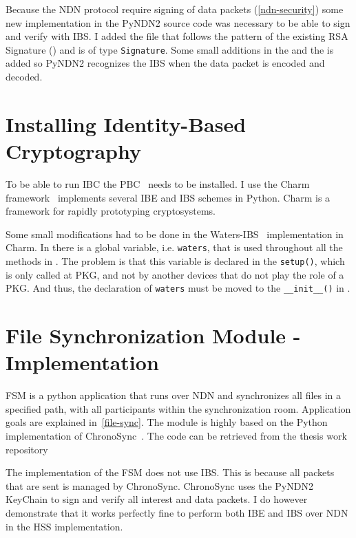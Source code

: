Because the \gls{NDN} protocol require signing of \gls{data} packets (\autoref{ndn-security}) some new implementation in the \gls{PyNDN2} source code was necessary to be able to sign and verify with \gls{IBS}.
I added the  file that follows the pattern of the existing RSA Signature () and is of type \texttt{Signature}.
Some small additions in the  and the  is added so \gls{PyNDN2} recognizes the \gls{IBS} when the \gls{data} packet is encoded and decoded.

\section{Installing Identity-Based Cryptography}
To be able to run \gls{IBC} the \gls{PBC}~\cite{ben2007implementation} needs to be installed.
I use the Charm framework~\cite{charm13} implements several \gls{IBE} and \gls{IBS} schemes in Python.
Charm is a framework for rapidly prototyping cryptosystems.


Some small modifications had to be done in the Waters-\gls{IBS}~\cite{DBLP:journals/iacr/Waters04} implementation in Charm.
In  there is a global variable, i.e. \texttt{waters}, that is used throughout all the methods in .
The problem is that this variable is declared in the \texttt{setup()}, which is only called at \gls{PKG}, and not by another devices that do not play the role of a \gls{PKG}. 
And thus, the declaration of \texttt{waters} must be moved to the \texttt{\_\_init\_\_()} in .


\section{File Synchronization Module - Implementation}
\gls{FSM} is a python application that runs over \gls{NDN} and synchronizes all files in a specified path, with all participants within the synchronization room.
Application goals are explained in~\autoref{file-sync}.
The module is highly based on the Python implementation of ChronoSync~\cite[test-chrono-chat.py]{pyndn2-git}.
The code can be retrieved from the thesis work repository~\cite[fileSync.py]{garseg15}

The implementation of the \gls{FSM} does not use \gls{IBS}. 
This is because all packets that are sent is managed by ChronoSync. 
ChronoSync uses the PyNDN2 KeyChain to sign and verify all \gls{interest} and \gls{data} packets.
I do however demonstrate that it works perfectly fine to perform both \gls{IBE} and \gls{IBS} over \gls{NDN} in the \gls{HSS} implementation.

